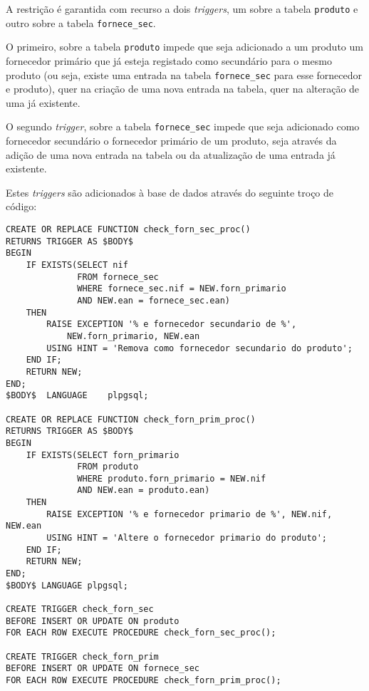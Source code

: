 \documentclass[12pt]{extarticle}
\begin{document}
A restrição é garantida com recurso a dois \textit{triggers}, um sobre a tabela \texttt{produto} e outro sobre a tabela \texttt{fornece\_sec}. \par

O primeiro, sobre a tabela \texttt{produto} impede que seja adicionado a um produto um fornecedor primário que já esteja registado como secundário para o mesmo produto (ou seja, existe uma entrada na tabela \texttt{fornece\_sec} para esse fornecedor e produto), quer na criação de uma nova entrada na tabela, quer na alteração de uma já existente.\par

O segundo \textit{trigger}, sobre a tabela \texttt{fornece\_sec} impede que seja adicionado como fornecedor secundário o fornecedor primário de um produto, seja através da adição de uma nova entrada na tabela ou da atualização de uma entrada já existente.\par

Estes \textit{triggers} são adicionados à base de dados através do seguinte troço de código:\par

\begin{lstlisting}
CREATE OR REPLACE FUNCTION check_forn_sec_proc()
RETURNS TRIGGER AS $BODY$
BEGIN
    IF EXISTS(SELECT nif
              FROM fornece_sec
              WHERE fornece_sec.nif = NEW.forn_primario
              AND NEW.ean = fornece_sec.ean)
    THEN
        RAISE EXCEPTION '% e fornecedor secundario de %',
        	NEW.forn_primario, NEW.ean
        USING HINT = 'Remova como fornecedor secundario do produto';
    END IF;
    RETURN NEW;
END;
$BODY$  LANGUAGE    plpgsql;

CREATE OR REPLACE FUNCTION check_forn_prim_proc() 
RETURNS TRIGGER AS $BODY$ 
BEGIN 
    IF EXISTS(SELECT forn_primario 
              FROM produto 
              WHERE produto.forn_primario = NEW.nif 
              AND NEW.ean = produto.ean) 
    THEN 
        RAISE EXCEPTION '% e fornecedor primario de %', NEW.nif, NEW.ean 
        USING HINT = 'Altere o fornecedor primario do produto'; 
    END IF; 
    RETURN NEW; 
END; 
$BODY$ LANGUAGE plpgsql;

CREATE TRIGGER check_forn_sec
BEFORE INSERT OR UPDATE ON produto
FOR EACH ROW EXECUTE PROCEDURE check_forn_sec_proc();

CREATE TRIGGER check_forn_prim
BEFORE INSERT OR UPDATE ON fornece_sec 
FOR EACH ROW EXECUTE PROCEDURE check_forn_prim_proc();
\end{lstlisting}
\end{document}
